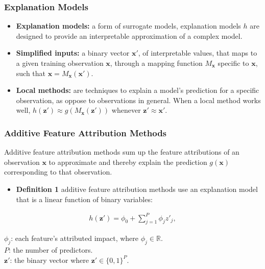 \begin{frame}\frametitle{Explanation Models}

	\begin{itemize}
	\item \textbf{Explanation models:} a form of surrogate models, explanation models $h$ are designed to provide an interpretable approximation of a complex model. 
	\bigskip
	\item  \textbf{Simplified inputs:} a binary vector $\mathbf{x'}$, of interpretable values, that maps to a given training observation $\mathbf{x}$, through a mapping function $M_\mathbf{x}$ specific to $\mathbf{x}$, such that $\mathbf{x} = M_\mathbf{x}(\mathbf{x'})$.  
	\bigskip
	\item  \textbf{Local methods:} are techniques to explain a model's prediction for a specific observation, as oppose to observations in general.  When a local method works well, $h(\mathbf{z'}) \approx g(M_\mathbf{x}(\mathbf{z'}))$ whenever $\mathbf{z'} \approx \mathbf{x'}$.
	\end{itemize}
	
\end{frame}


\begin{frame}\frametitle{Additive Feature Attribution Methods}
Additive feature attribution methods sum up the feature attributions of an observation  $\mathbf{x}$ to approximate and thereby explain the prediction $g(\mathbf{x})$ corresponding to that observation. 
	\bigskip
	\begin{itemize}
	\item  \textbf{Definition 1}  additive feature attribution methods use an explanation model that is a linear function of binary variables:
	\end{itemize}

	\begin{equation}
	\begin{aligned}		
		h(\mathbf{z'})= \phi_0 + \sum_{j=1}^P \phi_j z'_j,
	\end{aligned}
	\end{equation}
	
	$\phi_j$: each feature's attributed impact, where $\phi_j \in \mathbb{R}$.\\
	$P$: the number of predictors. \\
	$\mathbf{z'}$: the binary vector where $\mathbf{z'} \in \{0,1\}^P$.
	
\end{frame}

